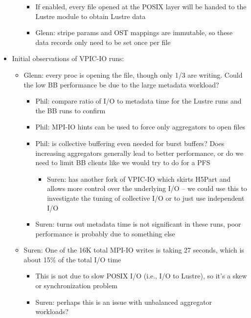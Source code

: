 \documentclass[conference,10pt,compsocconf]{IEEEtran}
\begin{document}
\begin{itemize}
\begin{itemize}
\begin{itemize}
        \item If enabled, every file opened at the POSIX layer will be handed to the Lustre
              module to obtain Lustre data
        \item Glenn: stripe params and OST mappings are immutable, so these data records
              only need to be set once per file
        \end{itemize}
    \end{itemize}
\item Initial observations of VPIC-IO runs:
    \begin{itemize}
    \item Glenn: every proc is opening the file, though only 1/3 are writing. Could the
          low BB performance be due to the large metadata workload?
        \begin{itemize}
        \item Phil: compare ratio of I/O to metadata time for the Lustre runs and the BB
              runs to confirm
        \item Phil: MPI-IO hints can be used to force only aggregators to open files
        \item Phil: is collective buffering even needed for burst buffers? Does increasing
              aggregators generally lead to better performance, or do we need to limit BB
              clients like we would try to do for a PFS
            \begin{itemize}
            \item Suren: has another fork of VPIC-IO which skirts H5Part and allows more control
                  over the underlying I/O -- we could use this to investigate the tuning of
                  collective I/O or to just use independent I/O
            \end{itemize}
        \item Suren: turns out metadata time is not significant in these runs, poor performance
              is probably due to something else
        \end{itemize}
    \item Suren: One of the 16K total MPI-IO writes is taking 27 seconds, which is about 15\%
          of the total I/O time
        \begin{itemize}
        \item This is not due to slow POSIX I/O (i.e., I/O to Lustre), so it's a skew or synchronization
              problem
        \item Suren: perhaps this is an issue with unbalanced aggregator workloads?

\end{itemize}
\end{itemize}
\end{itemize}
\end{document}

